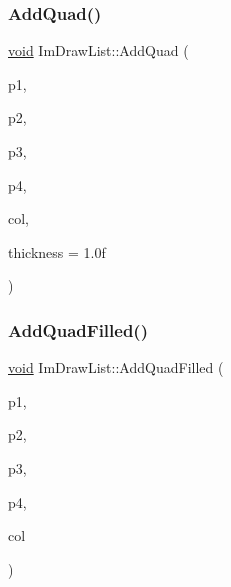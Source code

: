 \mbox{\label{structImDrawList_a57b014138de51397db0570d88c770d9f}} 
\subsubsection{\texorpdfstring{Add\+Quad()}{AddQuad()}}
{\footnotesize\ttfamily \hyperlink{imgui__impl__opengl3__loader_8h_ac668e7cffd9e2e9cfee428b9b2f34fa7}{void} Im\+Draw\+List\+::\+Add\+Quad (\begin{DoxyParamCaption}\item[{const \hyperlink{structImVec2}{Im\+Vec2} \&}]{p1,  }\item[{const \hyperlink{structImVec2}{Im\+Vec2} \&}]{p2,  }\item[{const \hyperlink{structImVec2}{Im\+Vec2} \&}]{p3,  }\item[{const \hyperlink{structImVec2}{Im\+Vec2} \&}]{p4,  }\item[{Im\+U32}]{col,  }\item[{float}]{thickness = {\ttfamily 1.0f} }\end{DoxyParamCaption})}

\mbox{\label{structImDrawList_a2b982fbad35f8736fdfc9d6e7db2ca94}} 
\subsubsection{\texorpdfstring{Add\+Quad\+Filled()}{AddQuadFilled()}}
{\footnotesize\ttfamily \hyperlink{imgui__impl__opengl3__loader_8h_ac668e7cffd9e2e9cfee428b9b2f34fa7}{void} Im\+Draw\+List\+::\+Add\+Quad\+Filled (\begin{DoxyParamCaption}\item[{const \hyperlink{structImVec2}{Im\+Vec2} \&}]{p1,  }\item[{const \hyperlink{structImVec2}{Im\+Vec2} \&}]{p2,  }\item[{const \hyperlink{structImVec2}{Im\+Vec2} \&}]{p3,  }\item[{const \hyperlink{structImVec2}{Im\+Vec2} \&}]{p4,  }\item[{Im\+U32}]{col }\end{DoxyParamCaption})}


